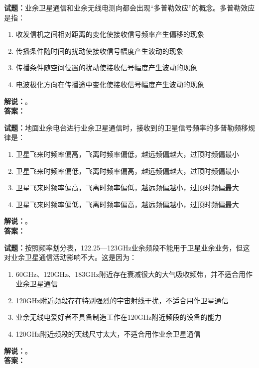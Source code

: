 \documentclass{ctexbook}
\begin{document}
\bigskip

\noindent\textbf{试题：}业余卫星通信和业余无线电测向都会出现“多普勒效应”的概念。多普勒效应是指：
\begin{enumerate}[leftmargin=3em]
  \item 收发信机之间相对距离的变化使接收信号频率产生偏移的现象
  \item 传播条件随时间的扰动使接收信号幅度产生波动的现象
  \item 传播条件随空间位置的扰动使接收信号幅度产生波动的现象
  \item 电波极化方向在传播途中变化使接收信号幅度产生波动的现象
\end{enumerate}
\noindent\textbf{解说：}\textbf{}。\\\noindent\textbf{答案：}

\bigskip

\noindent\textbf{试题：}地面业余电台进行业余卫星通信时，接收到的卫星信号频率的多普勒频移规律是：
\begin{enumerate}[leftmargin=3em]
  \item 卫星飞来时频率偏高，飞离时频率偏低，越远频偏越大，过顶时频偏最小
  \item 卫星飞来时频率偏低，飞离时频率偏高，越远频偏越大，过顶时频偏最小
  \item 卫星飞来时频率偏高，飞离时频率偏低，越远频偏越小，过顶时频偏最大
  \item 卫星飞来时频率偏低，飞离时频率偏高，越远频偏越小，过顶时频偏最大
\end{enumerate}
\noindent\textbf{解说：}\textbf{}。\\\noindent\textbf{答案：}

\bigskip

\noindent\textbf{试题：}按照频率划分表，122.25—123\unit{\GHz}业余频段不能用于卫星业余业务，但这对业余卫星通信活动影响不大。这是因为：
\begin{enumerate}[leftmargin=3em]
  \item 60\unit{\GHz}、120\unit{\GHz}、183\unit{\GHz}附近存在衰减很大的大气吸收频带，并不适合用作业余卫星通信
  \item 120\unit{\GHz}附近频段存在特别强烈的宇宙射线干扰，不适合用作卫星通信
  \item 业余无线电爱好者不具备制造工作在120\unit{\GHz}附近频段的设备的能力
  \item 120\unit{\GHz}附近频段的天线尺寸太大，不适合用作业余卫星通信
\end{enumerate}
\noindent\textbf{解说：}\textbf{}。\\\noindent\textbf{答案：}
\end{document}

